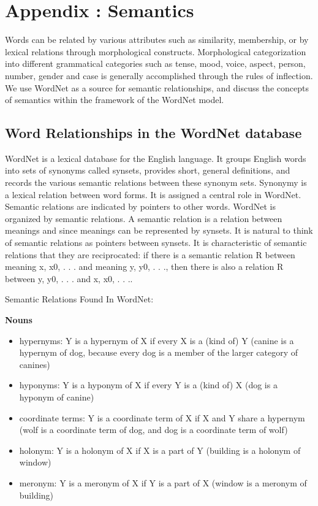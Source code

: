 \section{Appendix : Semantics}
Words can be related by various attributes such as similarity, membership, or by lexical relations through morphological constructs.  Morphological categorization into different grammatical categories such as tense, mood, voice, aspect, person, number, gender and case is generally accomplished through the rules of inflection.  We use WordNet as a source for semantic relationships, and discuss the concepts of semantics within the framework of the WordNet model.

\subsection{Word Relationships in the WordNet database }
 WordNet \cite{WORDNET} is a lexical database for the English language. It groups English words into sets of synonyms called synsets, provides short, general definitions, and records the various semantic relations between these synonym sets.  Synonymy is a lexical relation between word forms. It is assigned a central role in WordNet. Semantic relations are indicated by pointers to other words. WordNet is organized by semantic relations. A semantic relation is a relation between meanings and since meanings can be represented by synsets.  It is natural to think of semantic relations as pointers between synsets. It is characteristic of semantic relations that they are reciprocated: if there is a semantic relation R between meaning {x, x0, . . .} and meaning {y, y0, . . .}, then there is also a relation R~ between {y, y0, . . .} and {x, x0, . . .}.

Semantic Relations Found In WordNet:

\textbf{Nouns}
\begin{itemize}
  \item hypernyms: Y is a hypernym of X if every X is a (kind of) Y (canine is a hypernym of dog, because every dog is a member of the larger category of canines)

  \item hyponyms: Y is a hyponym of X if every Y is a (kind of) X (dog is a hyponym of canine)

  \item coordinate terms: Y is a coordinate term of X if X and Y share a hypernym (wolf is a coordinate term of dog, and dog is a coordinate term of wolf)
   \item   holonym: Y is a holonym of X if X is a part of Y (building is a holonym of window)
    \item meronym: Y is a meronym of X if Y is a part of X (window is a meronym of building)

\end{itemize}


